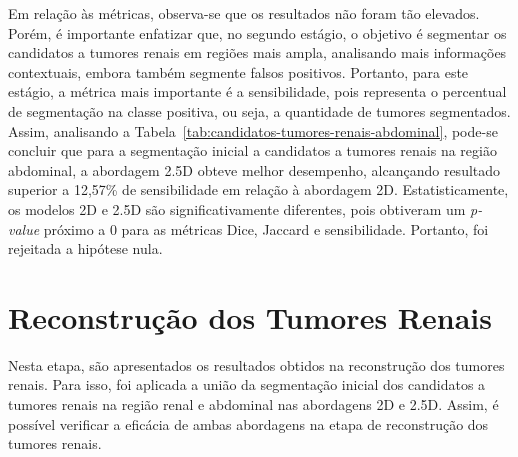 \begin{table}[!ht]
\caption{Resultados da etapa de segmentação de candidatos a tumores renais na região abdominal.}
\label{tab:candidatos-tumores-renais-abdominal}
\centering
{}
\end{table}

Em relação às métricas, observa-se que os resultados não foram tão elevados. Porém, é importante enfatizar que, no segundo estágio, o objetivo é segmentar os candidatos a tumores renais em regiões mais ampla, analisando mais informações contextuais, embora também segmente falsos positivos. Portanto, para este estágio, a métrica mais importante é a sensibilidade, pois representa o percentual de segmentação na classe positiva, ou seja, a quantidade de tumores segmentados. Assim, analisando a Tabela~\ref{tab:candidatos-tumores-renais-abdominal}, pode-se concluir que para a segmentação inicial a candidatos a tumores renais na região abdominal, a abordagem 2.5D obteve melhor desempenho, alcançando resultado superior a 12,57\% de sensibilidade em relação à abordagem 2D. Estatisticamente, os modelos 2D e 2.5D são significativamente diferentes, pois obtiveram um \textit{p-value} próximo a 0 para as métricas Dice, Jaccard e sensibilidade. Portanto, foi rejeitada a hipótese nula.

\section{Reconstrução dos Tumores Renais}
\label{sec:reconstrucao-tumores-renais}

Nesta etapa, são apresentados os resultados obtidos na reconstrução dos tumores renais. Para isso, foi aplicada a união da segmentação inicial dos candidatos a tumores renais na região renal e abdominal nas abordagens 2D e 2.5D. Assim, é possível verificar a eficácia de ambas abordagens na etapa de reconstrução dos tumores renais.

